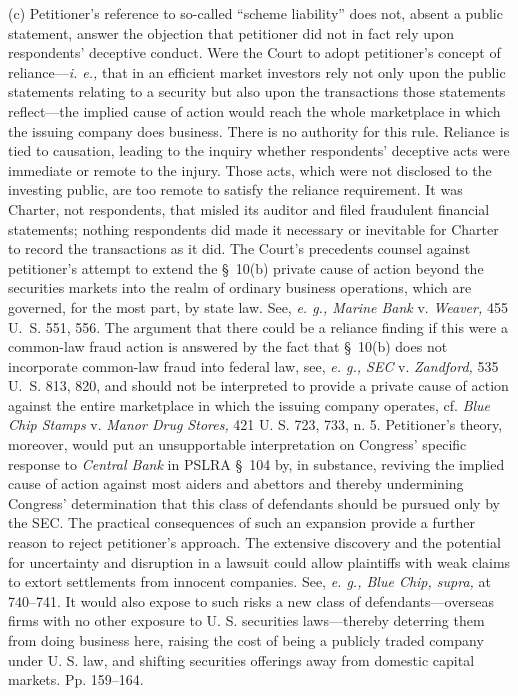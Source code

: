   (c) Petitioner's reference to so-called ``scheme liability'' does not, absent a public statement, answer the objection that petitioner did not in fact rely upon respondents' deceptive conduct. Were the Court to adopt petitioner's concept of reliance---\emph{i. e.,} that in an efficient market investors rely not only upon the public statements relating to a security but also upon the transactions those statements reflect---the implied cause of action would reach the whole marketplace in which the issuing company does business. There is no authority for this rule. Reliance is tied to causation, leading to the inquiry whether respondents' deceptive acts were immediate or remote to the injury. Those acts, which were not disclosed to the investing public, are too remote to satisfy the reliance requirement. It was Charter, not respondents, that misled its auditor and filed fraudulent financial statements; nothing respondents did made it necessary or inevitable for Charter to record the transactions as it did. The Court's precedents counsel against petitioner's attempt to extend the \S~10(b) private cause of action beyond the securities markets into the realm of ordinary business operations, which are governed, for the most part, by state law. See, \emph{e. g., Marine Bank} v. \emph{Weaver,} 455 U.~S. 551, 556. The argument that there could be a reliance finding if this were a common-law fraud action is answered by the fact that \S~10(b) does not incorporate common-law fraud into federal law, see, \emph{e. g., SEC} v. \emph{Zandford,} 535 U.~S. 813, 820, and should not be interpreted to provide a private cause of action against the entire marketplace in which the issuing company operates, cf. \emph{Blue Chip Stamps} v. \emph{Manor Drug Stores,} 421 U. S. 723, 733, n. 5. Petitioner's theory, moreover, would put an unsupportable interpretation on Congress' specific response to \emph{Central Bank} in PSLRA \S~104 by, in substance, reviving the implied cause of action against most aiders and abettors and thereby undermining Congress' determination that this class of defendants should be pursued only by the SEC. The practical consequences of such an expansion provide a further reason to reject petitioner's approach. The extensive discovery and the potential for uncertainty and disruption in a lawsuit could allow plaintiffs with weak claims to extort settlements from innocent companies. See, \emph{e. g., Blue Chip, supra,} at 740--741. It would also expose to such risks a new class of defendants---overseas firms with no other exposure to U. S. securities laws---thereby deterring them from doing business here, raising the cost of being a \newpage  publicly traded company under U. S. law, and shifting securities offerings away from domestic capital markets. Pp. 159--164.

